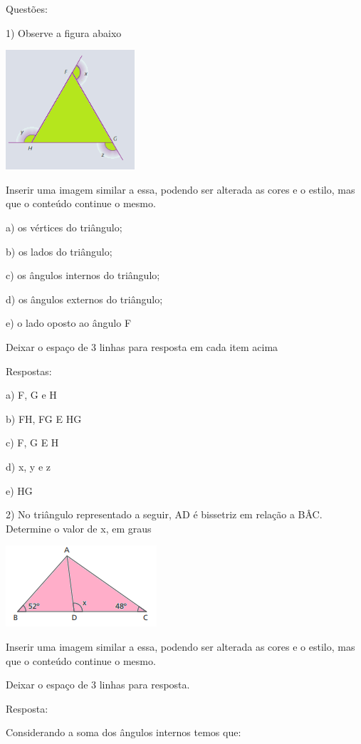 {Questões:

1) Observe a figura abaixo

\includegraphics[width=1.88333in,height=1.75048in]{./imgSAEB_8_MAT/media/image13.png}

Inserir uma imagem similar a essa, podendo ser alterada as cores e o
estilo, mas que o conteúdo continue o mesmo.

a) os vértices do triângulo;

b) os lados do triângulo;

c) os ângulos internos do triângulo;

d) os ângulos externos do triângulo;

e) o lado oposto ao ângulo F

Deixar o espaço de 3 linhas para resposta em cada item acima

Respostas:

a) F, G e H

b) FH, FG E HG

c) F, G E H

d) x, y e z

e) HG

2) No triângulo representado a seguir, AD é bissetriz em relação a BÂC.
Determine o valor de x, em graus

\includegraphics[width=2.20833in,height=1.1875in]{./imgSAEB_8_MAT/media/image14.png}

Inserir uma imagem similar a essa, podendo ser alterada as cores e o
estilo, mas que o conteúdo continue o mesmo.

Deixar o espaço de 3 linhas para resposta.

Resposta:

Considerando a soma dos ângulos internos temos que:

}
